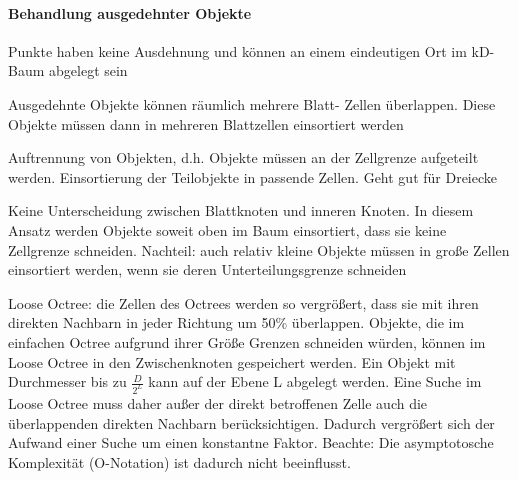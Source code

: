 \documentclass[landscape]{article}
\begin{document}
\begin{multicols}{3}
  \paragraph{Behandlung ausgedehnter Objekte}
  \begin{itemize*}
    \item Punkte haben keine Ausdehnung und können an einem eindeutigen Ort im kD-Baum abgelegt sein
    \item Ausgedehnte Objekte können räumlich mehrere Blatt- Zellen überlappen. Diese Objekte müssen dann in mehreren Blattzellen einsortiert werden
  \end{itemize*}
  \begin{enumerate*}
    \item Auftrennung von Objekten, d.h. Objekte müssen an der Zellgrenze aufgeteilt werden. Einsortierung der Teilobjekte in passende Zellen. Geht gut für Dreiecke
    \item Keine Unterscheidung zwischen Blattknoten und inneren Knoten. In diesem Ansatz werden Objekte soweit oben im Baum einsortiert, dass sie keine Zellgrenze schneiden. Nachteil: auch relativ kleine Objekte müssen in große Zellen einsortiert werden, wenn sie deren Unterteilungsgrenze schneiden
    \item Loose Octree: die Zellen des Octrees werden so vergrößert, dass sie mit ihren direkten Nachbarn in jeder Richtung um 50\% überlappen. Objekte, die im einfachen Octree aufgrund ihrer Größe Grenzen schneiden würden, können im Loose Octree in den Zwischenknoten gespeichert werden. Ein Objekt mit Durchmesser bis zu $\frac{D}{2^L}$ kann auf der Ebene L abgelegt werden. Eine Suche im Loose Octree muss daher außer der direkt betroffenen Zelle auch die überlappenden direkten Nachbarn berücksichtigen. Dadurch vergrößert sich der Aufwand einer Suche um einen konstantne Faktor. Beachte: Die asymptotosche Komplexität (O-Notation) ist dadurch nicht beeinflusst.
  \end{enumerate*}
  
\end{multicols}
\newpage
\end{document}
